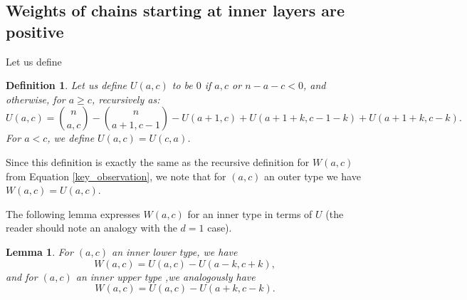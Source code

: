 \documentclass[11pt, reqno]{amsart}
\newtheorem{lemma}[theorem]{Lemma}
\newtheorem{definition}[theorem]{Definition}
\numberwithin{equation}{section}
\begin{document}
\subsection{Weights of chains starting at inner layers are positive}
\label{section_d2_inner}

Let us define
\begin{definition}
\label{x_definition}
    Let us define $U(a, c)$ to be $0$ if $a, c$ or $ n-a-c<0$, and otherwise, for $a \geqslant c$, recursively as:
    \begin{equation*}
        U(a, c)=\binom{n}{a, c} - \binom{n}{a+1, c-1} - U(a+1, c) + U(a+1+k, c-1-k) + U(a+1+k, c-k).
    \end{equation*}
    For $a<c$, we define $U(a, c)=U(c, a)$.
\end{definition}
    
Since this definition is exactly the same as the recursive definition for $W(a, c)$ from Equation \ref{key_observation}, we note that for $(a, c)$ an outer type we have $W(a, c)=U(a, c)$.

The following lemma expresses $W(a, c)$ for an inner type in terms of $U$ (the reader should note an analogy with the $d=1$ case).

\begin{lemma}
    For $(a, c)$ an inner lower type, we have
    \begin{equation*}
        W(a, c)=U(a, c)-U(a-k, c+k),
    \end{equation*}
    and for $(a, c)$ an inner upper type ,we analogously have
    \begin{equation*}
        W(a, c)=U(a, c)-U(a+k, c-k).
    \end{equation*}
\end{lemma}
\end{document}
